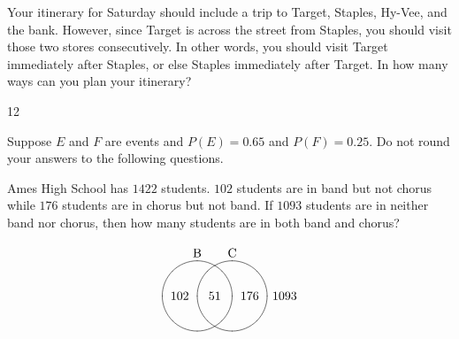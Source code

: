 \documentclass[addpoints,12pt]{exam}
\begin{document}
\begin{questions}
\ifprintanswers\else\newpage\fi

\question[15] Your itinerary for Saturday should
include a trip to Target, Staples, Hy-Vee, and the bank.
However, since Target is across the street from Staples,
you should visit those two stores consecutively. In other
words, you should visit Target immediately after Staples, or else
Staples immediately after Target. In how many ways
can you plan your itinerary?
\begin{solution}[4in]12\end{solution}

\question[12] Suppose $E$ and $F$ are events
and $P\left(E\right)=0.65$ and $P\left(F\right)=0.25$.
Do not round your answers to the following questions.
\ifprintanswers\else\newpage\fi

\question[12] Ames High School has $1422$ students.
$102$ students are in band but not chorus while
$176$ students are in chorus but not band.
If $1093$ students are in neither band nor chorus,
then how many students are in both band and chorus?
\begin{solution}[4in]
\[\begin{xy}<.5cm,0cm>:
(-1,2)*+!D{\text{B}};
(1,2)*+!D{\text{C}};
(-1,0)*\cir<1cm>{};
(1,0)*\cir<1cm>{};
(0,0)*{51};
(-2,0)*{102};
(2,0)*{176};
(4,0)*{1093};
\end{xy}\]
\end{solution}


\end{questions}
\end{document}
